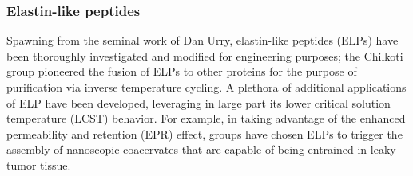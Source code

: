 \begin{refsection}
\subsubsection{Elastin-like peptides}

Spawning from the seminal work of Dan Urry, elastin-like peptides (ELPs) have
been thoroughly investigated and modified for engineering purposes; the Chilkoti
group pioneered the fusion of ELPs to other proteins for the purpose of
purification via inverse temperature cycling.\cite{Meyer1999} A plethora of
additional applications of ELP have been developed, leveraging in large part its
lower critical solution temperature (LCST) behavior.\cite{Urry2002} For example,
in taking advantage of the enhanced permeability and retention (EPR) effect,
groups have chosen ELPs to trigger the assembly of nanoscopic coacervates
 that are capable of being entrained in leaky tumor
tissue.\cite{Nakayama2010,DeLasHerasAlarcon2005} 


\end{refsection}
